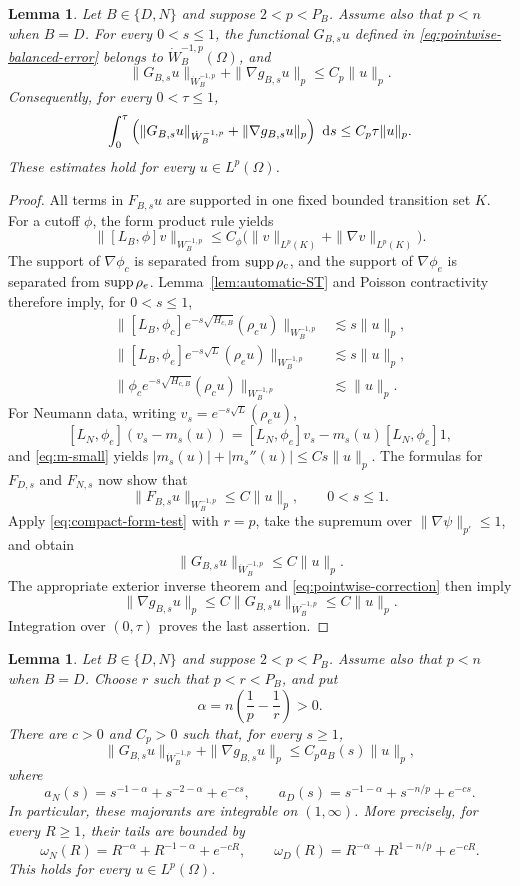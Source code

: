 \documentclass[12pt]{amsart}
\newcommand\dd{\,{\rm d}}
\newcommand{\supp}{{\rm supp}{\hspace{.05cm}}}
\newtheorem{lemma}[theorem]{Lemma}
\theoremstyle{remark}
\begin{document}
\begin{lemma}
\label{lem:short-time-homogeneous-error}
Let \(B\in\{D,N\}\) and suppose \(2<p<P_B\).  Assume also that
\(p<n\) when \(B=D\).  For every
\(0<s\leq1\), the functional \(G_{B,s}u\) defined in
\eqref{eq:pointwise-balanced-error} belongs to
\(\dot W^{-1,p}_B(\Omega)\), and
\[
 \|G_{B,s}u\|_{\dot W^{-1,p}_B}
 +\|\nabla g_{B,s}u\|_p
 \leq C_p\|u\|_p.
\]
Consequently, for every \(0<\tau\leq1\),
\[
 \int_0^\tau
 \left(\|G_{B,s}u\|_{\dot W^{-1,p}_B}
       +\|\nabla g_{B,s}u\|_p\right)\,\dd s
 \leq C_p\tau\|u\|_p.
\]
These estimates hold for every \(u\in L^p(\Omega)\).
\end{lemma}

\begin{proof}
All terms in \(F_{B,s}u\) are supported in one fixed bounded transition
set \(K\).  For a cutoff \(\phi\), the form product rule yields
\[
 \|[L_B,\phi]v\|_{W_B^{-1,p}}
 \leq C_\phi\bigl(\|v\|_{L^p(K)}
                  +\|\nabla v\|_{L^p(K)}\bigr).
\]
The support of \(\nabla\phi_c\) is separated from \(\supp\rho_c\), and the support of \(\nabla\phi_e\) is separated from \(\supp\rho_e\).
Lemma~\ref{lem:automatic-ST} and Poisson contractivity therefore imply,
for \(0<s\leq1\),
\begin{align*}
 \|[L_B,\phi_c]e^{-s\sqrt{H_{c,B}}}(\rho_cu)\|_{W_B^{-1,p}}
 &\lesssim s\|u\|_p,\\
 \|[L_B,\phi_e]e^{-s\sqrt L}(\rho_eu)\|_{W_B^{-1,p}}
 &\lesssim s\|u\|_p,\\
 \|\phi_ce^{-s\sqrt{H_{c,B}}}(\rho_cu)\|_{W_B^{-1,p}}
 &\lesssim\|u\|_p.
\end{align*}
For Neumann data, writing \(v_s=e^{-s\sqrt L}(\rho_eu)\),
\[
 [L_N,\phi_e](v_s-m_s(u))
 =[L_N,\phi_e]v_s-m_s(u)[L_N,\phi_e]1,
\]
and \eqref{eq:m-small} yields $|m_s(u)|+|m_s''(u)|\leq Cs\|u\|_p$. The formulas for \(F_{D,s}\) and \(F_{N,s}\) now show that
\[
 \|F_{B,s}u\|_{W_B^{-1,p}}\leq C\|u\|_p,
 \qquad 0<s\leq1.
\]
Apply \eqref{eq:compact-form-test} with \(r=p\), take the supremum over
\(\|\nabla\psi\|_{p'}\leq1\), and obtain
\[
 \|G_{B,s}u\|_{\dot W^{-1,p}_B}\leq C\|u\|_p.
\]
The appropriate exterior inverse theorem and
\eqref{eq:pointwise-correction} then imply
\[
 \|\nabla g_{B,s}u\|_p
 \leq C\|G_{B,s}u\|_{\dot W^{-1,p}_B}
 \leq C\|u\|_p.
\]
Integration over \((0,\tau)\) proves the last assertion.
\end{proof}

\begin{lemma}
\label{lem:large-time-homogeneous-error}
Let \(B\in\{D,N\}\) and suppose \(2<p<P_B\).  Assume also that
\(p<n\) when \(B=D\).  Choose \(r\) such that \(p<r<P_B\), and put
\[
 \alpha=n\left(\frac1p-\frac1r\right)>0.
\]
There are \(c>0\) and \(C_p>0\) such that, for every \(s\geq1\),
\[
 \|G_{B,s}u\|_{\dot W^{-1,p}_B}
 +\|\nabla g_{B,s}u\|_p
 \leq C_pa_B(s)\|u\|_p,
\]
where
\[
 a_N(s)=s^{-1-\alpha}+s^{-2-\alpha}+e^{-cs},
 \qquad
 a_D(s)=s^{-1-\alpha}+s^{-n/p}+e^{-cs}.
\]
In particular, these majorants are integrable on \((1,\infty)\).  More
precisely, for every \(R\geq1\), their tails are bounded by
\[
 \omega_N(R)=R^{-\alpha}+R^{-1-\alpha}+e^{-cR},
 \qquad
 \omega_D(R)=R^{-\alpha}+R^{1-n/p}+e^{-cR}.
\]
This holds for every \(u\in L^p(\Omega)\).
\end{lemma}
\end{document}

